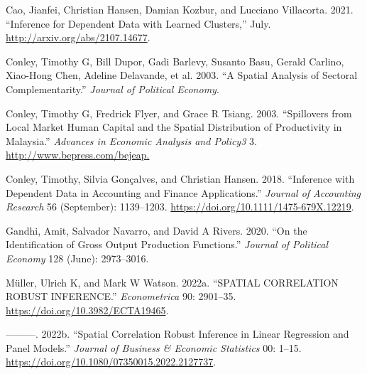 \documentclass[
]{article}
\newlength{\cslhangindent}
\newlength{\cslentryspacingunit} %
\newenvironment{CSLReferences}[2] %
 {%
  \setlength{\parindent}{0pt}
  \ifodd #1
  \let\oldpar\par
  \def\par{\hangindent=\cslhangindent\oldpar}
  \fi
  \setlength{\parskip}{#2\cslentryspacingunit}
 }%
 {}
\begin{document}
\hypertarget{refs}{}
\begin{CSLReferences}{1}{0}
\leavevmode{}%
Cao, Jianfei, Christian Hansen, Damian Kozbur, and Lucciano Villacorta.
2021. {``Inference for Dependent Data with Learned Clusters,''} July.
\url{http://arxiv.org/abs/2107.14677}.

\leavevmode{}%
Conley, Timothy G, Bill Dupor, Gadi Barlevy, Susanto Basu, Gerald
Carlino, Xiao-Hong Chen, Adeline Delavande, et al. 2003. {``A Spatial
Analysis of Sectoral Complementarity.''} \emph{Journal of Political
Economy}.

\leavevmode{}%
Conley, Timothy G, Fredrick Flyer, and Grace R Tsiang. 2003.
{``Spillovers from Local Market Human Capital and the Spatial
Distribution of Productivity in Malaysia.''} \emph{Advances in Economic
Analysis and Policy3} 3. \url{http://www.bepress.com/bejeap.}

\leavevmode{}%
Conley, Timothy, Silvia Gonçalves, and Christian Hansen. 2018.
{``Inference with Dependent Data in Accounting and Finance
Applications.''} \emph{Journal of Accounting Research} 56 (September):
1139--1203. \url{https://doi.org/10.1111/1475-679X.12219}.

\leavevmode{}%
Gandhi, Amit, Salvador Navarro, and David A Rivers. 2020. {``On the
Identification of Gross Output Production Functions.''} \emph{Journal of
Political Economy} 128 (June): 2973--3016.

\leavevmode{}%
Müller, Ulrich K, and Mark W Watson. 2022a. {``SPATIAL CORRELATION
ROBUST INFERENCE.''} \emph{Econometrica} 90: 2901--35.
\url{https://doi.org/10.3982/ECTA19465}.

\leavevmode{}%
---------. 2022b. {``Spatial Correlation Robust Inference in Linear
Regression and Panel Models.''} \emph{Journal of Business \& Economic
Statistics} 00: 1--15.
\url{https://doi.org/10.1080/07350015.2022.2127737}.

\end{CSLReferences}
\end{document}
